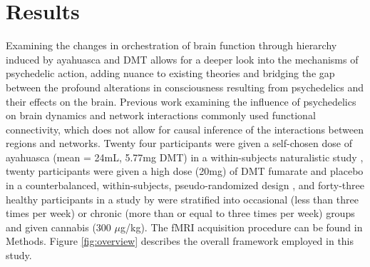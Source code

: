 \chapter{Results}
Examining the changes in orchestration of brain function through hierarchy induced by ayahuasca and DMT allows for a deeper look into the mechanisms of psychedelic action, adding nuance to existing theories and bridging the gap between the profound alterations in consciousness resulting from psychedelics and their effects on the brain. Previous work examining the influence of psychedelics on brain dynamics and network interactions commonly used functional connectivity, which does not allow for causal inference of the interactions between regions and networks. Twenty four participants were given a self-chosen dose of ayahuasca (mean = 24mL, 5.77mg DMT) in a within-subjects naturalistic study \parencite{Mallaroni2022}, twenty participants were given a high dose (20mg) of DMT fumarate and placebo in a counterbalanced, within-subjects, pseudo-randomized design \parencite{Timmermann2023}, and forty-three healthy participants in a study by \textcite{Ramaekers2022} were stratified into occasional (less than three times per week) or chronic (more than or equal to three times per week) groups and given cannabis (300 $\mu$g/kg). The fMRI acquisition procedure can be found in Methods. Figure \ref{fig:overview} describes the overall framework employed in this study. 


